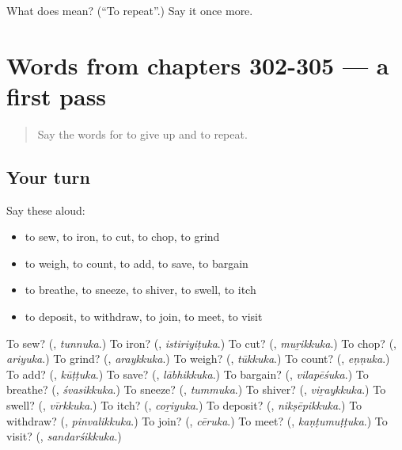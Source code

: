 \begin{tcolorbox}[breakable,colback=teal!4,colframe=teal!35!black,title={Before you move on}]
What does  mean? (\textquotedblleft{}To repeat\textquotedblright{}.) Say it once more.
\end{tcolorbox}
\section[(dialogue)]{Words from chapters 302-305 — a first pass}

\label{lesson:ML-R310-first-pass-words-from-chapters-302-305}



\begin{quote}
Say the words for to give up and to repeat.
\end{quote}

\subsection*{Your turn}
Say these aloud:

\begin{itemize}
\raggedright
  \item to sew, to iron, to cut, to chop, to grind
  \item to weigh, to count, to add, to save, to bargain
  \item to breathe, to sneeze, to shiver, to swell, to itch
  \item to deposit, to withdraw, to join, to meet, to visit
\end{itemize}

\begin{tcolorbox}[breakable,colback=teal!4,colframe=teal!35!black,title={Before you move on}]
To sew? (\textbf{}, \emph{tunnuka}.) To iron? (\textbf{}, \emph{istiriyiṭuka}.) To cut? (\textbf{}, \emph{muṟikkuka}.) To chop? (\textbf{}, \emph{ariyuka}.) To grind? (\textbf{}, \emph{araykkuka}.) To weigh? (\textbf{}, \emph{tūkkuka}.) To count? (\textbf{}, \emph{eṇṇuka}.) To add? (\textbf{}, \emph{kūṭṭuka}.) To save? (\textbf{}, \emph{lābhikkuka}.) To bargain? (\textbf{}, \emph{vilapēśuka}.) To breathe? (\textbf{}, \emph{śvasikkuka}.) To sneeze? (\textbf{}, \emph{tummuka}.) To shiver? (\textbf{}, \emph{viṟaykkuka}.) To swell? (\textbf{}, \emph{vīrkkuka}.) To itch? (\textbf{}, \emph{coṟiyuka}.) To deposit? (\textbf{}, \emph{nikṣēpikkuka}.) To withdraw? (\textbf{}, \emph{pinvalikkuka}.) To join? (\textbf{}, \emph{cēruka}.) To meet? (\textbf{}, \emph{kaṇṭumuṭṭuka}.) To visit? (\textbf{}, \emph{sandarśikkuka}.)
\end{tcolorbox}

